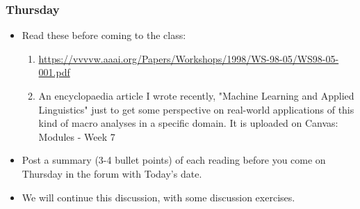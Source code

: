 \documentclass{beamer}
\begin{document}
\begin{frame}
\frametitle{Thursday}
\begin{itemize}
\item Read these before coming to the class: 
\begin{enumerate}
\item \url{https://vvvvw.aaai.org/Papers/Workshops/1998/WS-98-05/WS98-05-001.pdf}
\item An encyclopaedia article I wrote recently, "Machine Learning and Applied Linguistics" just to get some perspective on real-world applications of this kind of macro analyses in a specific domain. It is uploaded on Canvas: Modules - Week 7
\end{enumerate}
\item Post a summary (3-4 bullet points) of each reading before you come on Thursday in the forum with Today's date.
\item We will continue this discussion, with some discussion exercises. 
\end{itemize}
\end{frame}
\end{document}
